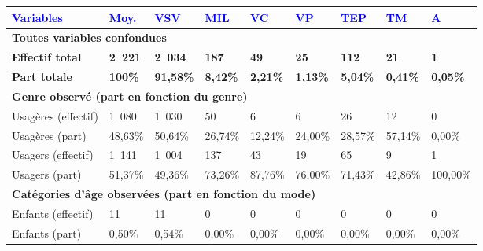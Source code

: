         \begin{longtable}{p{3.7cm}p{0.9cm}p{0.9cm}p{0.9cm}p{0.9cm}p{0.9cm}p{0.9cm}p{0.9cm}p{0.9cm}}
         \textcolor{blue}{\textbf{Variables}} & \textcolor{blue}{\textbf{Moy.}} & \textcolor{blue}{\textbf{VSV}} & \textcolor{blue}{\textbf{MIL}} & \textcolor{blue}{\textbf{VC}} & \textcolor{blue}{\textbf{VP}} & \textcolor{blue}{\textbf{TEP}} & \textcolor{blue}{\textbf{TM}} & \textcolor{blue}{\textbf{A}}\\
        \hline
        \endhead        
\multicolumn{9}{l}{\textbf{Toutes variables confondues}}\\
    \small{\textbf{Effectif total}} & \small{\textbf{2~221}} & \small{\textbf{2~034}} & \small{\textbf{187}} & \small{\textbf{49}} & \small{\textbf{25}} & \small{\textbf{112}} & \small{\textbf{21}} & \small{\textbf{1}}\\    
    \small{\textbf{Part totale}} & \small{\textbf{100\%}} & \small{\textbf{91,58\%}} & \small{\textbf{8,42\%}} & \small{\textbf{2,21\%}} & \small{\textbf{1,13\%}} & \small{\textbf{5,04\%}} & \small{\textbf{0,41\%}} & \small{\textbf{0,05\%}}\\
    \hline    
\multicolumn{9}{l}{\textbf{Genre observé (part en fonction du genre)}}\\
    \small{Usagères (effectif)} & \small{1~080} & \small{1~030} & \small{50} & \small{6} & \small{6} & \small{26} & \small{12} & \small{0}\\    
    \small{Usagères (part)} & \small{48,63\%} & \small{50,64\%} & \small{26,74\%} & \small{12,24\%} & \small{24,00\%} & \small{28,57\%} & \small{57,14\%} & \small{0,00\%}\\   
    \small{Usagers (effectif)} & \small{1~141} & \small{1~004} & \small{137} & \small{43} & \small{19} & \small{65} & \small{9} & \small{1}\\    
    \small{Usagers (part)} & \small{51,37\%} & \small{49,36\%} & \small{73,26\%} & \small{87,76\%} & \small{76,00\%} & \small{71,43\%} & \small{42,86\%} & \small{100,00\%}\\
    \hline    
\multicolumn{9}{l}{\textbf{Catégories d'âge observées (part en fonction du mode)}}\\
    \small{Enfants (effectif)} & \small{11} & \small{11} & \small{0} & \small{0} & \small{0} & \small{0} & \small{0} & \small{0}\\    
    \small{Enfants (part)} & \small{0,50\%} & \small{0,54\%} & \small{0,00\%} & \small{0,00\%} & \small{0,00\%} & \small{0,00\%} & \small{0,00\%} & \small{0,00\%}\\   

\end{longtable}
